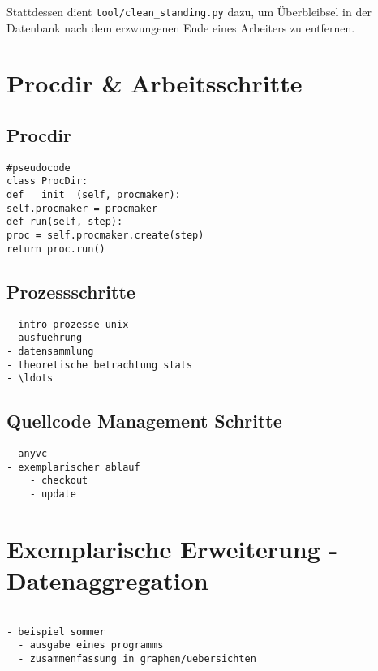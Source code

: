Stattdessen dient \verb|tool/clean_standing.py| dazu,
um Überbleibsel in der Datenbank nach dem erzwungenen Ende
eines Arbeiters zu entfernen.



\section{Procdir \& Arbeitsschritte}

\subsection{Procdir}
\lstset{language=python}
\begin{lstlisting}
#pseudocode
class ProcDir:
def __init__(self, procmaker):
self.procmaker = procmaker
def run(self, step):
proc = self.procmaker.create(step)
return proc.run()
\end{lstlisting}


\subsection{Prozessschritte}

\begin{verbatim}
- intro prozesse unix
- ausfuehrung
- datensammlung
- theoretische betrachtung stats
- \ldots
\end{verbatim}

\subsection{Quellcode Management Schritte}


\begin{verbatim}
- anyvc
- exemplarischer ablauf
    - checkout
    - update
\end{verbatim}

\section{Exemplarische Erweiterung - Datenaggregation}

 
\begin{verbatim}

- beispiel sommer
  - ausgabe eines programms
  - zusammenfassung in graphen/uebersichten

\end{verbatim}

